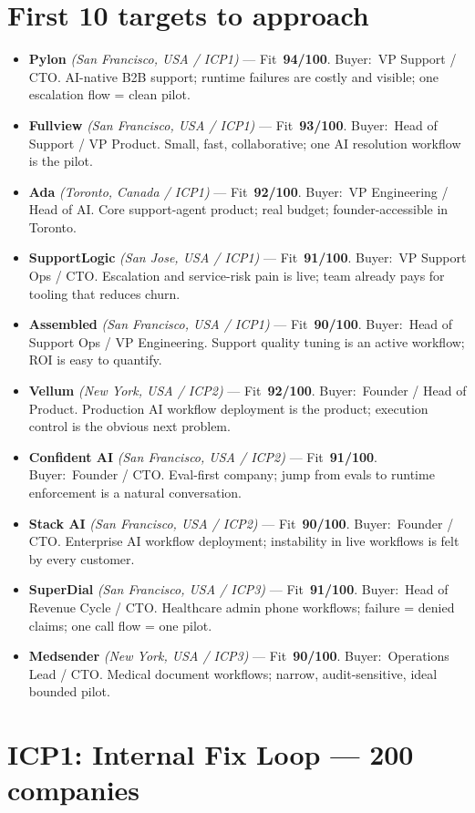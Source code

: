 \documentclass[10pt]{article}
\newcommand{\topcand}[5]{\item \textcolor{green!50!black}{\textbf{#1} \textit{(#2)}} --- Fit~\textbf{#3/100}. Buyer:~#4. #5}
\begin{document}
\section{First 10 targets to approach}
\begin{itemize}
\topcand{Pylon}{San Francisco, USA / ICP1}{94}{VP Support / CTO}{AI-native B2B support; runtime failures are costly and visible; one escalation flow = clean pilot.}
\topcand{Fullview}{San Francisco, USA / ICP1}{93}{Head of Support / VP Product}{Small, fast, collaborative; one AI resolution workflow is the pilot.}
\topcand{Ada}{Toronto, Canada / ICP1}{92}{VP Engineering / Head of AI}{Core support-agent product; real budget; founder-accessible in Toronto.}
\topcand{SupportLogic}{San Jose, USA / ICP1}{91}{VP Support Ops / CTO}{Escalation and service-risk pain is live; team already pays for tooling that reduces churn.}
\topcand{Assembled}{San Francisco, USA / ICP1}{90}{Head of Support Ops / VP Engineering}{Support quality tuning is an active workflow; ROI is easy to quantify.}
\topcand{Vellum}{New York, USA / ICP2}{92}{Founder / Head of Product}{Production AI workflow deployment is the product; execution control is the obvious next problem.}
\topcand{Confident AI}{San Francisco, USA / ICP2}{91}{Founder / CTO}{Eval-first company; jump from evals to runtime enforcement is a natural conversation.}
\topcand{Stack AI}{San Francisco, USA / ICP2}{90}{Founder / CTO}{Enterprise AI workflow deployment; instability in live workflows is felt by every customer.}
\topcand{SuperDial}{San Francisco, USA / ICP3}{91}{Head of Revenue Cycle / CTO}{Healthcare admin phone workflows; failure = denied claims; one call flow = one pilot.}
\topcand{Medsender}{New York, USA / ICP3}{90}{Operations Lead / CTO}{Medical document workflows; narrow, audit-sensitive, ideal bounded pilot.}
\end{itemize}
\clearpage
\section{ICP1: Internal Fix Loop --- 200 companies}
\end{document}
